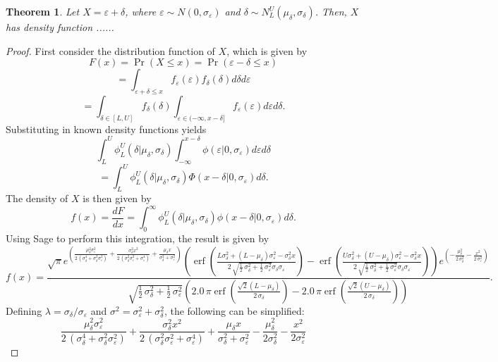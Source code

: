 \documentclass{article}
\newtheorem{theorem}{Theorem}
\newcommand{\ep}{\varepsilon}
\begin{document}
\begin{theorem}
	Let $X = \ep + \delta$, where $\ep\sim N(0, \sigma_\ep)$ and $\delta\sim N_L^U(\mu_\delta, \sigma_\delta)$. Then, $X$ has density function ......
\end{theorem}
\begin{proof}
		First consider the distribution function of $X$, which is given by
	$$F(x) = \Pr(X \leq x) = \Pr(\ep - \delta \leq x)$$
	$$= \int_{\ep + \delta \leq x} f_\ep(\ep) f_\delta(\delta) d\delta d\ep$$
	$$= \int_{\delta\in[L, U]} f_\delta(\delta) \int_{\ep\in (-\infty, x - \delta]} f_\ep(\ep) d\ep d\delta.$$
	Substituting in known density functions yields
	$$\int_L^U \phi_L^U(\delta | \mu_\delta, \sigma_\delta) \int_{-\infty}^{x - \delta} \phi(\ep | 0, \sigma_\ep) d\ep d\delta$$
	$$= \int_L^U \phi_L^U(\delta | \mu_\delta, \sigma_\delta) \Phi(x - \delta | 0, \sigma_\ep) d\delta.$$
	The density of $X$ is then given by
	$$f(x) = \frac{dF}{dx} = \int_0^\infty \phi_L^U(\delta | \mu_\delta, \sigma_\delta) \phi(x - \delta | 0, \sigma_\ep) d\delta.$$
	Using Sage to perform this integration, the result is given by
	$$f(x) = \frac{{\sqrt{\pi} e^{\left(\frac{\mu_{\delta}^{2} \sigma_{\ep}^{2}}{2 \, {\left(\sigma_{\delta}^{4} + \sigma_{\delta}^{2} \sigma_{\ep}^{2}\right)}} + \frac{\sigma_{\delta}^{2} x^{2}}{2 \, {\left(\sigma_{\delta}^{2} \sigma_{\ep}^{2} + \sigma_{\ep}^{4}\right)}} + \frac{\mu_{\delta} x}{\sigma_{\delta}^{2} + \sigma_{\ep}^{2}}\right)} \left( \operatorname{erf}\left(\frac{L \sigma_{\delta}^{2} + {\left(L - \mu_{\delta}\right)} \sigma_{\ep}^{2} - \sigma_{\delta}^{2} x}{2 \, \sqrt{\frac{1}{2} \, \sigma_{\delta}^{2} + \frac{1}{2} \, \sigma_{\ep}^{2}} \sigma_{\delta} \sigma_{\ep}}\right)  - \operatorname{erf}\left(\frac{U \sigma_{\delta}^{2} + {\left(U - \mu_{\delta}\right)} \sigma_{\ep}^{2} - \sigma_{\delta}^{2} x}{2 \, \sqrt{\frac{1}{2} \, \sigma_{\delta}^{2} + \frac{1}{2} \, \sigma_{\ep}^{2}} \sigma_{\delta} \sigma_{\ep}}\right) \right)} e^{\left(-\frac{\mu_{\delta}^{2}}{2 \, \sigma_{\delta}^{2}} - \frac{x^{2}}{2 \, \sigma_{\ep}^{2}}\right)}}{\sqrt{\frac{1}{2} \, \sigma_{\delta}^{2} + \frac{1}{2} \, \sigma_{\ep}^{2}} {\left(2.0 \, \pi \operatorname{erf}\left(\frac{\sqrt{2} {\left(L - \mu_{\delta}\right)}}{2 \, \sigma_{\delta}}\right) - 2.0 \, \pi \operatorname{erf}\left(\frac{\sqrt{2} {\left(U - \mu_{\delta}\right)}}{2 \, \sigma_{\delta}}\right)\right)}}.$$
	Defining $\lambda = \sigma_\delta / \sigma_\ep$ and $\sigma^2 = \sigma_\ep^2 + \sigma_\delta^2$, the following can be simplified:
	$$\frac{\mu_{\delta}^{2} \sigma_{\ep}^{2}}{2 \, {\left(\sigma_{\delta}^{4} + \sigma_{\delta}^{2} \sigma_{\ep}^{2}\right)}} + \frac{\sigma_{\delta}^{2} x^{2}}{2 \, {\left(\sigma_{\delta}^{2} \sigma_{\ep}^{2} + \sigma_{\ep}^{4}\right)}} + \frac{\mu_{\delta} x}{\sigma_{\delta}^{2} + \sigma_{\ep}^{2}} - \frac{\mu_\delta^2}{2\sigma_\delta^2} - \frac{x^2}{2\sigma_\ep^2}$$

\end{proof}
\end{document}
